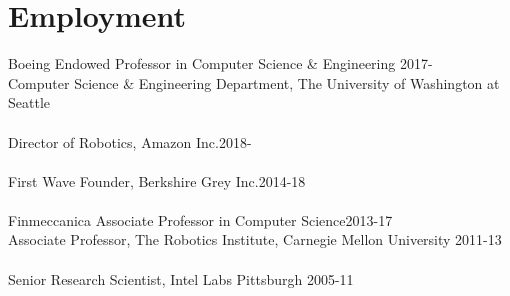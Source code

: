 
\section{Employment}
\noindent
Boeing Endowed Professor in Computer Science \& Engineering \hfill 2017-\\
Computer Science \& Engineering Department, 
The University of Washington at Seattle\\
\\
Director of Robotics, Amazon Inc.\hfill 2018-\\
\\
First Wave Founder, Berkshire Grey Inc.\hfill 2014-18\\
\\
Finmeccanica Associate Professor in Computer Science\hfill 2013-17\\
Associate Professor, 
The Robotics Institute,  Carnegie Mellon University
\hfill 2011-13\\
\\
Senior Research Scientist, Intel Labs Pittsburgh \hfill 2005-11

